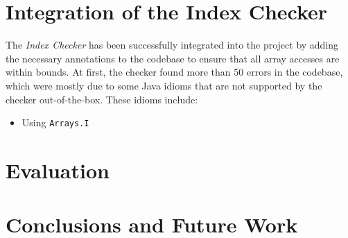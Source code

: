 \documentclass[a4paper, 11pt]{article}
\begin{document}
\pagebreak

\section{Integration of the Index Checker}

The \textit{Index Checker} has been successfully integrated into the project by adding the necessary annotations to the codebase to ensure that all array accesses are within bounds. At first, the checker found more than 50 errors in the codebase, which were mostly due to some Java idioms that are not supported by the checker out-of-the-box. These idioms include:

\begin{itemize}
    \item Using \texttt{Arrays.I}
\end{itemize}

\pagebreak

\section{Evaluation}

\pagebreak

\section{Conclusions and Future Work}

\nocite{*} %

\end{document}
